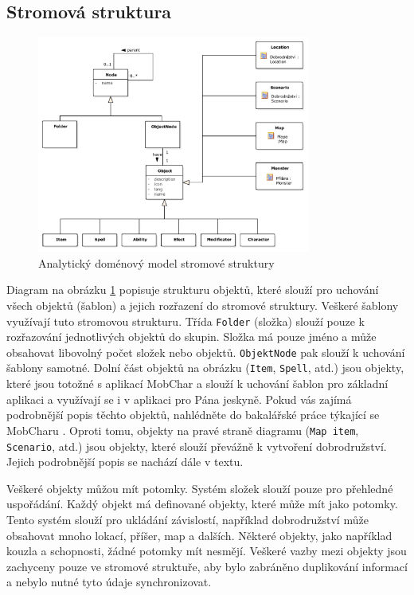\documentclass[thesis=B,czech]{resources/FITthesis}[2012/06/26]
\begin{document}
\subsection{Stromová struktura}
\begin{figure}\centering
	\includegraphics[width=0.8\textwidth]{images/domain_struktura}
	\caption[Analytický doménový model stromové struktury]{Analytický doménový model stromové struktury}\label{fig:dm_stromova_struktura}
\end{figure}
Diagram na obrázku \ref{fig:dm_stromova_struktura} popisuje strukturu objektů, které slouží pro uchování všech objektů (šablon) a jejich rozřazení do stromové struktury. Veškeré šablony využívají tuto stromovou strukturu. Třída \texttt{Folder} (složka) slouží pouze k rozřazování jednotlivých objektů do skupin. Složka má pouze jméno a může obsahovat libovolný počet složek nebo objektů. \texttt{ObjektNode} pak slouží k uchování šablony samotné. Dolní část objektů na obrázku (\texttt{Item}, \texttt{Spell}, atd.) jsou objekty, které jsou totožné s aplikací MobChar a slouží k uchování šablon pro základní aplikaci a využívají se i v aplikaci pro Pána jeskyně. Pokud vás zajímá podrobnější popis těchto objektů, nahlédněte do bakalářské práce týkající se MobCharu \cite{Weberova_2017}. Oproti tomu, objekty na pravé straně diagramu (\texttt{Map item}, \texttt{Scenario}, atd.) jsou objekty, které slouží převážně k vytvoření dobrodružství. Jejich podrobnější popis se nachází dále v textu.\par

Veškeré objekty můžou mít potomky. Systém složek slouží pouze pro přehledné uspořádání. Každý objekt má definované objekty, které může mít jako potomky. Tento systém slouží pro ukládání závislostí, například dobrodružství může obsahovat mnoho lokací, příšer, map a dalších. Některé objekty, jako například kouzla a schopnosti, žádné potomky mít nesmějí. Veškeré vazby mezi objekty jsou zachyceny pouze ve stromové struktuře, aby bylo zabráněno duplikování informací a nebylo nutné tyto údaje synchronizovat.
\end{document}
